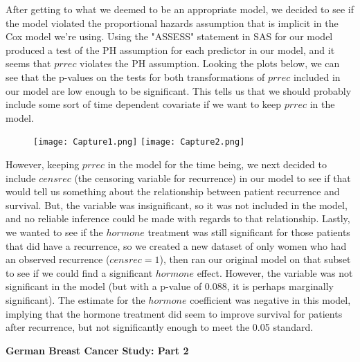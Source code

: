 \documentclass[11pt,letterpaper]{article}
\begin{document}
\par

After getting to what we deemed to be an appropriate model, we decided to see if the model violated the proportional hazards assumption that is implicit in the Cox model we're using. Using the "ASSESS" statement in SAS for our model produced a test of the PH assumption for each predictor in our model, and it seems that $prrec$ violates the PH assumption. Looking the plots below, we can see that the p-values on the tests for both transformations of $prrec$ included in our model are low enough to be significant. This tells us that we should probably include some sort of time dependent covariate if we want to keep $prrec$ in the model.

\begin{figure}[h!]
\centering
\texttt{[image: Capture1.png]}
\texttt{[image: Capture2.png]}
\end{figure} 

\par

However, keeping $prrec$ in the model for the time being, we next decided to include $censrec$ (the censoring variable for recurrence) in our model to see if that would tell us something about the relationship between patient recurrence and survival. But, the variable was insignificant, so it was not included in the model, and no reliable inference could be made with regards to that relationship. Lastly, we wanted to see if the $hormone$ treatment was still significant for those patients that did have a recurrence, so we created a new dataset of only women who had an observed recurrence ($censrec = 1$), then ran our original model on that subset to see if we could find a significant $hormone$ effect. However, the variable was not significant in the model (but with a p-value of 0.088, it is perhaps marginally significant). The estimate for the $hormone$ coefficient was negative in this model, implying that the hormone treatment did seem to improve survival for patients after recurrence, but not significantly enough to meet the 0.05 standard.

\begin{center}
\textbf{German Breast Cancer Study: Part 2}\\
\end{center}

\par
\end{document}
